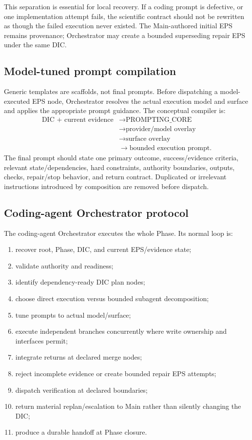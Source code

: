 \documentclass[11pt,a4paper]{article}
\begin{document}
This separation is essential for local recovery. If a coding prompt is defective, or one implementation attempt fails, the scientific contract should not be rewritten as though the failed execution never existed. The Main-authored initial EPS remains provenance; Orchestrator may create a bounded superseding repair EPS under the same DIC.

\subsection{Model-tuned prompt compilation}
Generic templates are scaffolds, not final prompts. Before dispatching a model-executed EPS node, Orchestrator resolves the actual execution model and surface and applies the appropriate prompt guidance. The conceptual compiler is:
\[
\begin{aligned}
\text{DIC + current evidence}
&\to \text{PROMPTING\_CORE}\\
&\to \text{provider/model overlay}\\
&\to \text{surface overlay}\\
&\to \text{bounded execution prompt}.
\end{aligned}
\]
The final prompt should state one primary outcome, success/evidence criteria, relevant state/dependencies, hard constraints, authority boundaries, outputs, checks, repair/stop behavior, and return contract. Duplicated or irrelevant instructions introduced by composition are removed before dispatch.

\subsection{Coding-agent Orchestrator protocol}
The coding-agent Orchestrator executes the whole Phase. Its normal loop is:
\begin{enumerate}
\item recover root, Phase, DIC, and current EPS/evidence state;
\item validate authority and readiness;
\item identify dependency-ready DIC plan nodes;
\item choose direct execution versus bounded subagent decomposition;
\item tune prompts to actual model/surface;
\item execute independent branches concurrently where write ownership and interfaces permit;
\item integrate returns at declared merge nodes;
\item reject incomplete evidence or create bounded repair EPS attempts;
\item dispatch verification at declared boundaries;
\item return material replan/escalation to Main rather than silently changing the DIC;
\item produce a durable handoff at Phase closure.
\end{enumerate}
\end{document}
